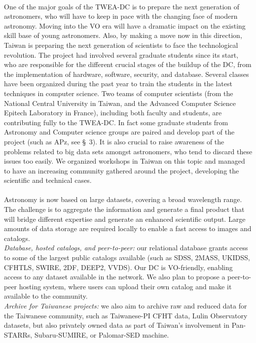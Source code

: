 \\
One of the major goals of the TWEA-DC is to prepare the next generation of astronomers, who will have to keep in pace with the changing face of modern astronomy. Moving into the VO era will have a dramatic impact on the existing skill base of young astronomers. Also, by making a move now in this direction, Taiwan is preparing the next generation of scientists to face the technological revolution. The project had involved several graduate students since its start, who are responsible for the different crucial stages of the buildup of the DC, from the implementation of hardware, software, security, and database. Several classes have been organized during the past year to train the students in the latest techniques in computer science. Two teams of computer scientists (from the National Central University in Taiwan, and the Advanced Computer Science Epitech Laboratory in France), including both faculty and students, are contributing fully to the TWEA-DC. In fact some graduate students from Astronomy and Computer science groups are paired and develop part of the project (such as APz, see \S~3). It is also crucial to raise awareness of the problems related to big data sets amongst astronomers, who tend to discard these issues too easily. We organized workshops in Taiwan on this topic and managed to have an increasing community gathered around the project, developing the scientific and technical cases.\\

\\
Astronomy is now based on large datasets, covering a broad wavelength range. The challenge is to aggregate the information and generate a final product that will bridge different expertise and generate an enhanced scientific output. Large amounts of data storage are required locally to enable a fast access to images and catalogs.  \\ 
{\it Database, hosted catalogs, and peer-to-peer:} our relational database grants access to some of the largest public catalogs available (such as SDSS, 2MASS, UKIDSS, CFHTLS, SWIRE, 2DF, DEEP2, VVDS). Our DC is VO-friendly, enabling access to any dataset available in the network. We also plan to propose a peer-to-peer hosting system, where users can upload their own catalog and make it available to the community.\\
{\it Archive for Taiwanese projects:} we also aim to archive raw and reduced data for the Taiwanese community, such as Taiwanese-PI CFHT data, Lulin Observatory datasets, but also privately owned data as part of Taiwan's involvement in Pan-STARRs, Subaru-SUMIRE, or Palomar-SED machine.\\

